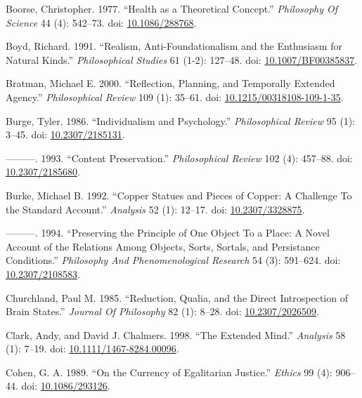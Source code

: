\documentclass[
  10pt,
  letterpaper,
  DIV=11,
  numbers=noendperiod,
  twoside]{scrartcl}
\newlength{\cslhangindent}
\newenvironment{CSLReferences}[2] %
 {\begin{list}{}{%
  \setlength{\itemindent}{0pt}
  \setlength{\leftmargin}{0pt}
  \setlength{\parsep}{0pt}
  \ifodd #1
   \setlength{\leftmargin}{\cslhangindent}
   \setlength{\itemindent}{-1\cslhangindent}
  \fi
  \setlength{\itemsep}{#2\baselineskip}}}
 {\end{list}}
\begin{document}
\begin{CSLReferences}{1}{0}
Boorse, Christopher. 1977. {``Health as a Theoretical Concept.''}
\emph{Philosophy Of Science} 44 (4): 542--73. doi:
\href{https://doi.org/10.1086/288768}{10.1086/288768}.

Boyd, Richard. 1991. {``Realism, Anti-Foundationalism and the Enthusiasm
for Natural Kinds.''} \emph{Philosophical Studies} 61 (1-2): 127--48.
doi: \href{https://doi.org/10.1007/BF00385837}{10.1007/BF00385837}.

Bratman, Michael E. 2000. {``Reflection, Planning, and Temporally
Extended Agency.''} \emph{Philosophical Review} 109 (1): 35--61. doi:
\href{https://doi.org/10.1215/00318108-109-1-35}{10.1215/00318108-109-1-35}.

Burge, Tyler. 1986. {``Individualism and Psychology.''}
\emph{Philosophical Review} 95 (1): 3--45. doi:
\href{https://doi.org/10.2307/2185131}{10.2307/2185131}.

---------. 1993. {``Content Preservation.''} \emph{Philosophical Review}
102 (4): 457--88. doi:
\href{https://doi.org/10.2307/2185680}{10.2307/2185680}.

Burke, Michael B. 1992. {``Copper Statues and Pieces of Copper: A
Challenge To the Standard Account.''} \emph{Analysis} 52 (1): 12--17.
doi: \href{https://doi.org/10.2307/3328875}{10.2307/3328875}.

---------. 1994. {``Preserving the Principle of One Object To a Place: A
Novel Account of the Relations Among Objects, Sorts, Sortals, and
Persistance Conditions.''} \emph{Philosophy And Phenomenological
Research} 54 (3): 591--624. doi:
\href{https://doi.org/10.2307/2108583}{10.2307/2108583}.

Churchland, Paul M. 1985. {``Reduction, Qualia, and the Direct
Introspection of Brain States.''} \emph{Journal Of Philosophy} 82 (1):
8--28. doi: \href{https://doi.org/10.2307/2026509}{10.2307/2026509}.

Clark, Andy, and David J. Chalmers. 1998. {``The Extended Mind.''}
\emph{Analysis} 58 (1): 7--19. doi:
\href{https://doi.org/10.1111/1467-8284.00096}{10.1111/1467-8284.00096}.

Cohen, G. A. 1989. {``On the Currency of Egalitarian Justice.''}
\emph{Ethics} 99 (4): 906--44. doi:
\href{https://doi.org/10.1086/293126}{10.1086/293126}.


\end{CSLReferences}
\end{document}
